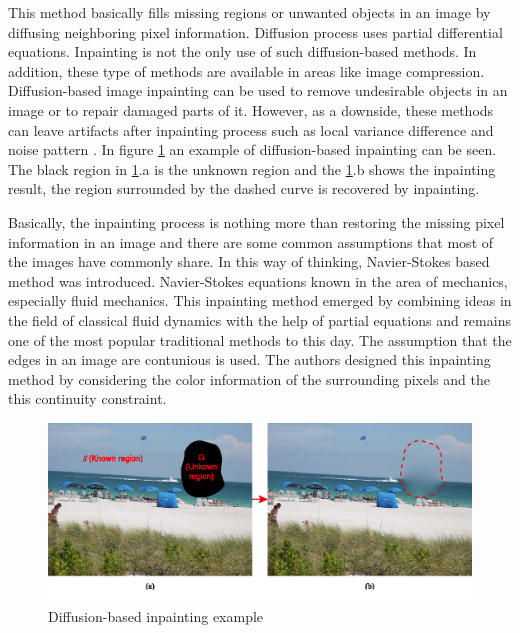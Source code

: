 This method basically fills missing regions or unwanted objects in an image by diffusing neighboring pixel information. Diffusion process uses partial differential equations. Inpainting is not the only use of such diffusion-based methods. In addition, these type of methods are available in areas like image compression. Diffusion-based image inpainting can be used to remove undesirable objects in an image or to repair damaged parts of it. However, as a downside, these methods can leave artifacts after inpainting process such as local variance difference and noise pattern \cite{diffusion_based_artifacts}. In figure \ref{fig:diffusion_based_inpainting} an example of diffusion-based inpainting can be seen. The black region in \ref{fig:diffusion_based_inpainting}.a is the unknown region and the \ref{fig:diffusion_based_inpainting}.b shows the inpainting result, the region surrounded by the dashed curve is recovered by inpainting.

Basically, the inpainting process is nothing more than restoring the missing pixel information in an image and there are some common assumptions that most of the images have commonly share. In this way of thinking, Navier-Stokes based method \cite{navier_stokes} was introduced. Navier-Stokes equations known in the area of mechanics, especially fluid mechanics. This inpainting method emerged by combining ideas in the field of classical fluid dynamics with the help of partial equations and remains one of the most popular traditional methods to this day. The assumption that the edges in an image are contunious is used. The authors designed this inpainting method by considering the color information of the surrounding pixels and the this continuity constraint.

\begin{figure}[h]
    \centering
    \includegraphics[width=14cm]{figures/chapter2/diffusion_based_inpainting.png}
    \caption{Diffusion-based inpainting example \cite{diffusion_based_inpainting}}
    \label{fig:diffusion_based_inpainting}
\end{figure}

